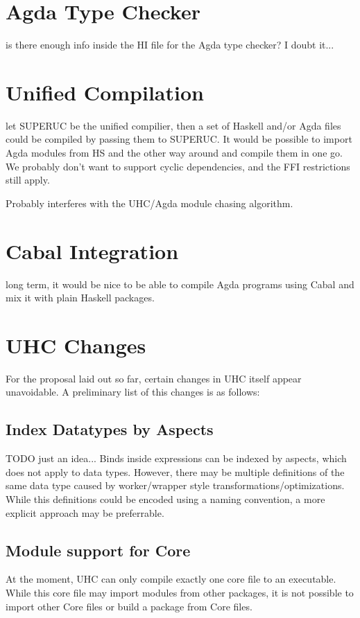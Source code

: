 \documentclass[12pt, a4paper, twoside]{report}
\begin{document}
\section{Agda Type Checker}
is there enough info inside the HI file for the Agda type checker? I doubt it...

\section{Unified Compilation}
let SUPERUC be the unified compilier, then a set of Haskell and/or Agda files
could be compiled by passing them to SUPERUC. It would be possible to import
Agda modules from HS and the other way around and compile them in one go.
We probably don't want to support cyclic dependencies, and the FFI restrictions still apply.

Probably interferes with the UHC/Agda module chasing algorithm.

\section{Cabal Integration}
long term, it would be nice to be able to compile Agda programs using Cabal and
mix it with plain Haskell packages.

\section{UHC Changes}
For the proposal laid out so far, certain changes in UHC itself appear
unavoidable. A preliminary list of this changes is as follows:

\subsection{Index Datatypes by Aspects}
TODO just an idea...
Binds inside expressions can be indexed by aspects, which does
not apply to data types. However, there may be multiple definitions
of the same data type caused by worker/wrapper style transformations/optimizations.
While this definitions could be encoded using a naming convention, a more explicit
approach may be preferrable.

\subsection{Module support for Core}
At the moment, UHC can only compile exactly one core file to an executable.
While this core file may import modules from other packages, it is not possible
to import other Core files or build a package from Core files.
\end{document}
